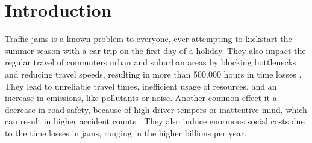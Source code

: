 \documentclass[a4paper,12pt]{report}
\begin{document}
\renewcommand\abstractname{Preliminary information and disclaimers}

\tableofcontents
\thispagestyle{empty}

\chapter{Introduction}
\setcounter{page}{1}
Traffic \glspl{jam} is a known problem to everyone, ever attempting to kickstart the summer season with a car trip on the first day of a holiday. They also impact the regular travel of commuters urban and suburban areas by blocking bottlenecks and reducing travel speeds, resulting in more than 500.000 hours in time losses \cite{ADAC2019}. They lead to unreliable travel times, inefficient usage of resources, and an increase in emissions, like pollutants or noise. Another common effect it a decrease in road safety, because of high driver tempers or inattentive mind, which can result in higher accident counts \cite{Sun2016}. They also induce enormous social costs due to the time losses in \glspl{jam}, ranging in the higher billions per year. \cite{RetallackOstendorf2019,ADAC2019,BardtFritsch2014}
\end{document}
